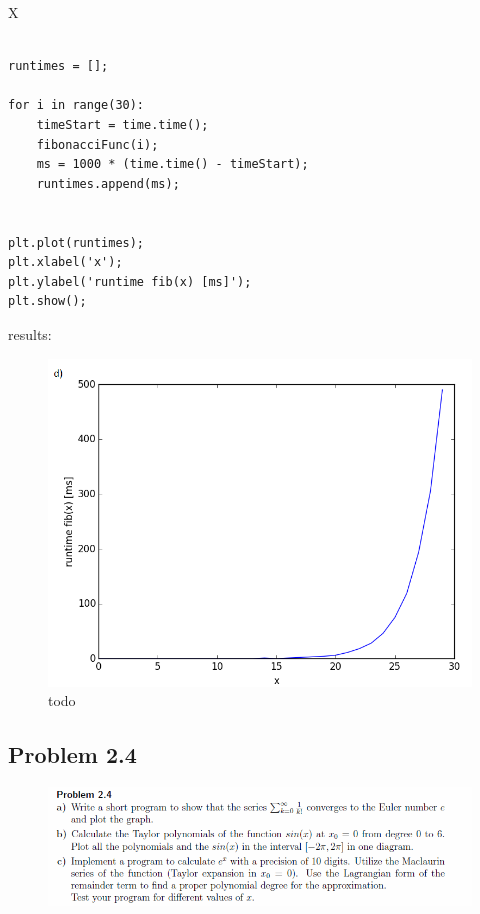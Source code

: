 X

\begin{lstlisting}[caption=todo]

runtimes = [];

for i in range(30):
	timeStart = time.time();
	fibonacciFunc(i);
	ms = 1000 * (time.time() - timeStart);
	runtimes.append(ms);


plt.plot(runtimes);
plt.xlabel('x');
plt.ylabel('runtime fib(x) [ms]');
plt.show();

\end{lstlisting}


results:



\begin{figure}[!ht]
\includegraphics[width=1\textwidth]{chapters/images/figure-2-3-d}
\caption{todo}
\end{figure}







\subsection{Problem 2.4}


\begin{figure}[!ht]
\includegraphics[width=1\textwidth]{chapters/images/desc-2-4}
\end{figure}


